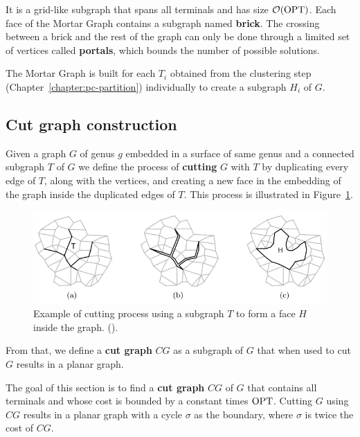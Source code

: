 It is a grid-like subgraph that spans all terminals and has size \(\mathcal{O}(\operatorname{\textrm{OPT}})\). Each face of the Mortar Graph contains a subgraph named \textbf{brick}. The crossing between a brick and the rest of the graph can only be done through a limited set of vertices called \textbf{portals}, which bounds the number of possible solutions.

The Mortar Graph is built for each \(T_i\) obtained from the clustering step (Chapter~\ref{chapter:pc-partition}) individually to create a subgraph \(H_i\) of \(G\).

\subsection{Cut graph construction}

Given a graph \(G\) of genus \(g\) embedded in a surface of same genus and a connected subgraph \(T\) of \(G\) we define the process of \textbf{cutting} \(G\) with \(T\) by duplicating every edge of \(T\), along with the vertices, and creating a new face in the embedding of the graph inside the duplicated edges of \(T\). This process is illustrated in Figure~\ref{fig:cut_graph_example}.

\begin{figure}[h]
    \centering
    \includegraphics[scale=0.7]{imgs/cut_graph_example.png}
    \caption {Example of cutting process using a subgraph \(T\) to form a face \(H\) inside the graph. (\cite{Borradaile2012}).}
    \label{fig:cut_graph_example}
\end{figure}


From that, we define a \textbf{cut graph} \(CG\) as a subgraph of \(G\) that when used to cut \(G\) results in a planar graph.

The goal of this section is to find a \textbf{cut graph} \(CG\) of \(G\) that contains all terminals and whose cost is bounded by a constant times \(\operatorname{\textrm{OPT}}\). Cutting \(G\) using \(CG\) results in a planar graph with a cycle \(\sigma\) as the boundary, where \(\sigma\) is twice the cost of \(CG\).

